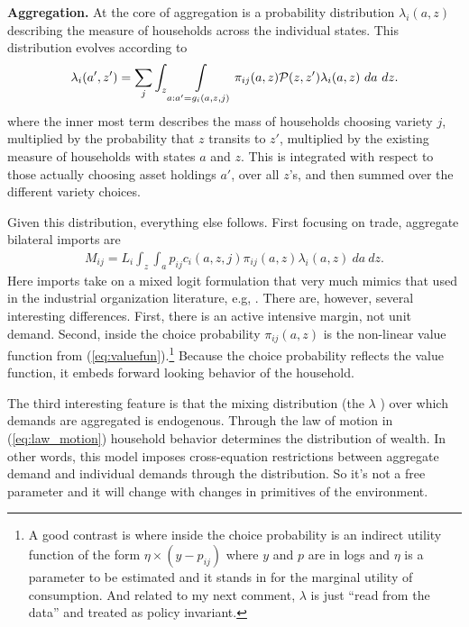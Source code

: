 \documentclass[12pt,pdftex]{article}
\begin{document}
\begin{onehalfspacing}
\textbf{Aggregation.} At the core of aggregation is a probability distribution $\lambda_{i}(a, z)$ describing the measure of households across the individual states. This distribution evolves according to
\begin{align}
\lambda_i(a', z') = \sum_{j} \int_{z}\int\displaylimits_{a: a' = g_{i}(a, z, j)} \pi_{ij}(a, z) \mathcal{P}(z, z') \lambda_i(a, z) \ da \ dz.
\label{eq:law_motion}
\end{align}
where the inner most term describes the mass of households choosing variety $j$, multiplied by the probability that $z$ transits to $z'$, multiplied by the existing measure of households with states $a$ and $z$. This is integrated with respect to those actually choosing asset holdings $a'$, over all $z$'s, and then summed over the different variety choices.

Given this distribution, everything else follows. First focusing on trade, aggregate bilateral imports are
\begin{align}
M_{ij} = L_i \int_{z} \int_{a}  p_{ij} c_{i}(a, z, j) \pi_{ij}(a, z) \lambda_i(a, z) \ da \ dz.
\label{eq:imports}
\end{align}
Here imports take on a mixed logit formulation that very much mimics that used in the industrial organization literature, e.g, \citet*{berry1995automobile}. There are, however, several interesting differences. First, there is an active intensive margin, not unit demand. Second, inside the choice probability $\pi_{ij}(a, z)$ is the non-linear value function from (\ref{eq:valuefun}).\footnote{A good contrast is \citet{nevo2000practitioner} where inside the choice probability is an indirect utility function of the form $\eta \times (y - p_{ij})$ where $y$ and $p$ are in logs and $\eta$ is a parameter to be estimated and it stands in for the marginal utility of consumption. And related to my next comment, $\lambda$ is just ``read from the data'' and treated as policy invariant.} Because the choice probability reflects the value function, it embeds forward looking behavior of the household.

The third interesting feature is that the mixing distribution (the $\lambda$ ) over which demands are aggregated is endogenous. Through the law of motion in (\ref{eq:law_motion}) household behavior determines the distribution of wealth. In other words, this model imposes cross-equation restrictions between aggregate demand and individual demands through the distribution. So it's not a free parameter and it will change with changes in primitives of the environment.


\end{onehalfspacing}
\end{document}
